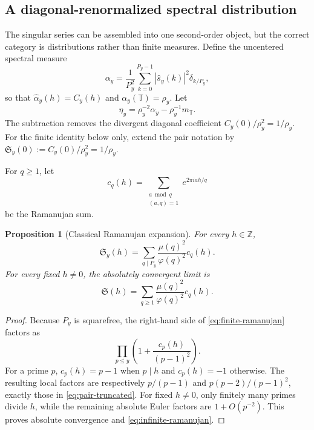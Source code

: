 \documentclass[11pt]{article}
\newtheorem{proposition}[theorem]{Proposition}
\theoremstyle{definition}
\theoremstyle{remark}
\newcommand{\Z}{\mathbb Z}
\newcommand{\T}{\mathbb T}
\begin{document}
\subsection{A diagonal-renormalized spectral distribution}

The singular series can be assembled into one second-order object, but the correct category is distributions rather than finite measures.  Define the uncentered spectral measure
\begin{equation}\label{eq:uncentered-spectrum}
    \alpha_y
    =\frac1{P_y^2}\sum_{k=0}^{P_y-1}
       |\widehat s_y(k)|^2\delta_{k/P_y},
\end{equation}
so that $\widehat\alpha_y(h)=C_y(h)$ and $\alpha_y(\T)=\rho_y$.  Let
\begin{equation}\label{eq:diagonal-renormalization}
    \eta_y=\rho_y^{-2}\alpha_y-\rho_y^{-1}m_{\T}.
\end{equation}
The subtraction removes the divergent diagonal coefficient $C_y(0)/\rho_y^2=1/\rho_y$.
For the finite identity below only, extend the pair notation by
$\mathfrak S_y(0):=C_y(0)/\rho_y^2=1/\rho_y$.

For $q\ge1$, let
\begin{equation}\label{eq:ramanujan-sum}
    c_q(h)=\sum_{\substack{a\bmod q\\(a,q)=1}}e^{2\pi i ah/q}
\end{equation}
be the Ramanujan sum.

\begin{proposition}[Classical Ramanujan expansion]\label{prop:ramanujan}
For every $h\in\Z$,
\begin{equation}\label{eq:finite-ramanujan}
    \mathfrak S_y(h)
    =\sum_{q\mid P_y}\frac{\mu(q)^2}{\varphi(q)^2}c_q(h).
\end{equation}
For every fixed $h\ne0$, the absolutely convergent limit is
\begin{equation}\label{eq:infinite-ramanujan}
    \mathfrak S(h)
    =\sum_{q\ge1}\frac{\mu(q)^2}{\varphi(q)^2}c_q(h).
\end{equation}
\end{proposition}

\begin{proof}
Because $P_y$ is squarefree, the right-hand side of \eqref{eq:finite-ramanujan} factors as
\[
    \prod_{p\le y}\left(1+\frac{c_p(h)}{(p-1)^2}\right).
\]
For a prime $p$, $c_p(h)=p-1$ when $p\mid h$ and $c_p(h)=-1$ otherwise.  The resulting local factors are respectively $p/(p-1)$ and $p(p-2)/(p-1)^2$, exactly those in \eqref{eq:pair-truncated}.  For fixed $h\ne0$, only finitely many primes divide $h$, while the remaining absolute Euler factors are $1+O(p^{-2})$.  This proves absolute convergence and \eqref{eq:infinite-ramanujan}.
\end{proof}
\end{document}
